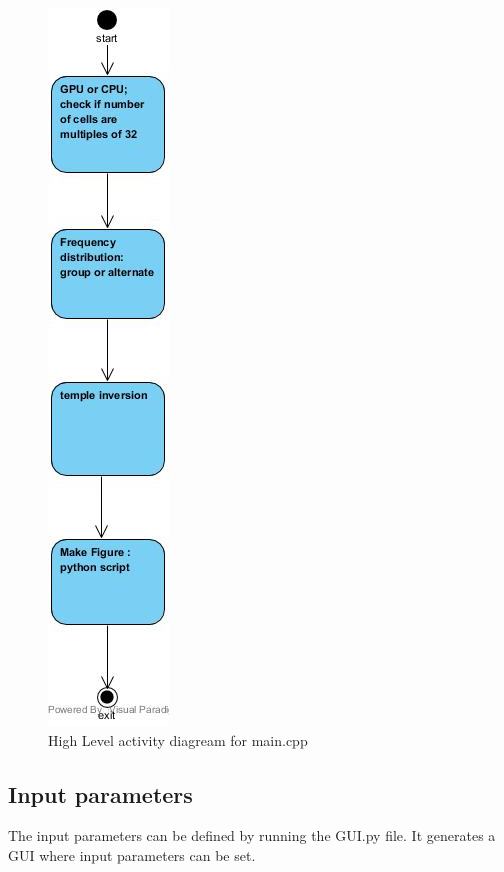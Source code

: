 \documentclass[10pt,a4paper]{article}
\begin{document}
\begin{figure}
\centering
 \includegraphics[scale=0.75]{main.jpg}
  \caption{High Level activity diagream for main.cpp}
  \label{fig:fig3}
\end{figure}


\subsection{Input parameters}

The input parameters can be defined by running the GUI.py file. It generates a GUI where input parameters can be set.
\end{document}
